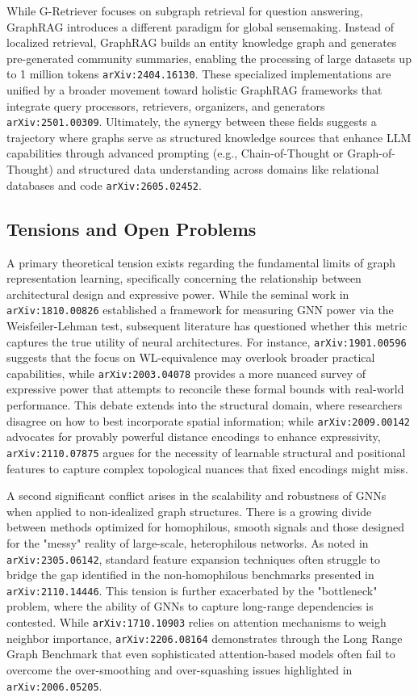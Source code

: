 \documentclass[11pt]{article}
\begin{document}
While G-Retriever focuses on subgraph retrieval for question answering, GraphRAG introduces a different paradigm for global sensemaking. Instead of localized retrieval, GraphRAG builds an entity knowledge graph and generates pre-generated community summaries, enabling the processing of large datasets up to 1 million tokens \texttt{arXiv:2404.16130}. These specialized implementations are unified by a broader movement toward holistic GraphRAG frameworks that integrate query processors, retrievers, organizers, and generators \texttt{arXiv:2501.00309}. Ultimately, the synergy between these fields suggests a trajectory where graphs serve as structured knowledge sources that enhance LLM capabilities through advanced prompting (e.g., Chain-of-Thought or Graph-of-Thought) and structured data understanding across domains like relational databases and code \texttt{arXiv:2605.02452}.

\subsection{Tensions and Open Problems}

A primary theoretical tension exists regarding the fundamental limits of graph representation learning, specifically concerning the relationship between architectural design and expressive power. While the seminal work in \texttt{arXiv:1810.00826} established a framework for measuring GNN power via the Weisfeiler-Lehman test, subsequent literature has questioned whether this metric captures the true utility of neural architectures. For instance, \texttt{arXiv:1901.00596} suggests that the focus on WL-equivalence may overlook broader practical capabilities, while \texttt{arXiv:2003.04078} provides a more nuanced survey of expressive power that attempts to reconcile these formal bounds with real-world performance. This debate extends into the structural domain, where researchers disagree on how to best incorporate spatial information; while \texttt{arXiv:2009.00142} advocates for provably powerful distance encodings to enhance expressivity, \texttt{arXiv:2110.07875} argues for the necessity of learnable structural and positional features to capture complex topological nuances that fixed encodings might miss.

A second significant conflict arises in the scalability and robustness of GNNs when applied to non-idealized graph structures. There is a growing divide between methods optimized for homophilous, smooth signals and those designed for the "messy" reality of large-scale, heterophilous networks. As noted in \texttt{arXiv:2305.06142}, standard feature expansion techniques often struggle to bridge the gap identified in the non-homophilous benchmarks presented in \texttt{arXiv:2110.14446}. This tension is further exacerbated by the "bottleneck" problem, where the ability of GNNs to capture long-range dependencies is contested. While \texttt{arXiv:1710.10903} relies on attention mechanisms to weigh neighbor importance, \texttt{arXiv:2206.08164} demonstrates through the Long Range Graph Benchmark that even sophisticated attention-based models often fail to overcome the over-smoothing and over-squashing issues highlighted in \texttt{arXiv:2006.05205}.
\end{document}
